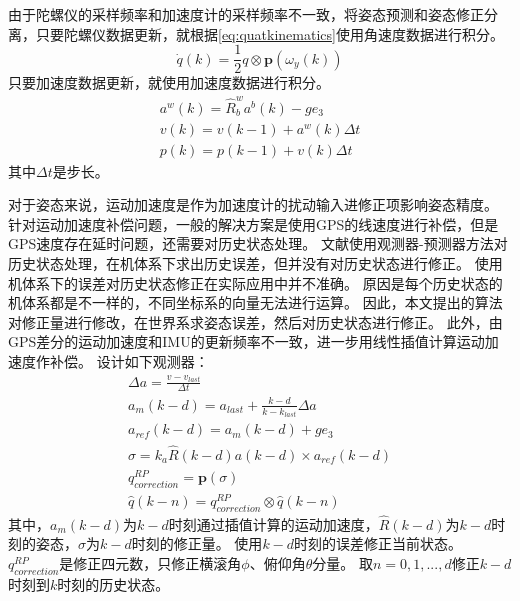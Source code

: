 \documentclass[
  type=master
]{gdutthesis}
\begin{document}
由于陀螺仪的采样频率和加速度计的采样频率不一致，将姿态预测和姿态修正分离，只要陀螺仪数据更新，就根据\autoref{eq:quatkinematics}使用角速度数据进行积分。
\begin{equation}\label{eq:quatint}
	\dot{q}(k)=\frac{1}{2} q \otimes \mathbf{p}(\omega_y(k))
\end{equation}
\vspace{1ex}只要加速度数据更新，就使用加速度数据进行积分。
\begin{gather}\label{eq:pvpredict}
		a^w(k) = \hat{R}_b^w a^b(k) - g e_3\\
		v(k) = v(k-1) + a^w(k) \Delta t\\
		p(k) = p(k-1) + v(k) \Delta t 
\end{gather}
其中$\Delta t$是步长。

对于姿态来说，运动加速度是作为加速度计的扰动输入进修正项影响姿态精度。
针对运动加速度补偿问题，一般的解决方案是使用GPS的线速度进行补偿，但是GPS速度存在延时问题，还需要对历史状态处理。
文献\parencite{khosravian2014velocity}使用观测器-预测器方法对历史状态处理，在机体系下求出历史误差，但并没有对历史状态进行修正。
使用机体系下的误差对历史状态修正在实际应用中并不准确。
原因是每个历史状态的机体系都是不一样的，不同坐标系的向量无法进行运算。
因此，本文提出的算法对修正量进行修改，在世界系求姿态误差，然后对历史状态进行修正。
此外，由GPS差分的运动加速度和IMU的更新频率不一致，进一步用线性插值计算运动加速度作补偿。
\vspace{1ex}设计如下观测器：
\begin{gather}\label{eq:myrpcorrection}
		\Delta a = \frac{v - v_{last}}{\Delta t}\\
		a_m (k-d) = a_{last} + \frac{k-d}{k-k_{last}} \Delta a\\
		a_{ref} (k-d) = a_m (k-d) + g e_3\\
		\sigma = k_a \hat{R}(k-d) a(k-d) \times a_{ref}(k-d)\\
		q_{correction}^{RP} = \mathbf{p}(\sigma)\\
		\hat{q}(k-n) = q_{correction}^{RP} \otimes \hat{q}(k-n)
\end{gather}
其中，$a_m (k-d)$为$k-d$时刻通过插值计算的运动加速度，$\hat{R}(k-d)$为$k-d$时刻的姿态，$\sigma$为$k-d$时刻的修正量。
使用$k-d$时刻的误差修正当前状态。
$q_{correction}^{RP}$是修正四元数，只修正横滚角$\phi$、俯仰角$\theta$分量。
取$n=0,1,...,d$修正$k-d$时刻到$k$时刻的历史状态。
\end{document}
